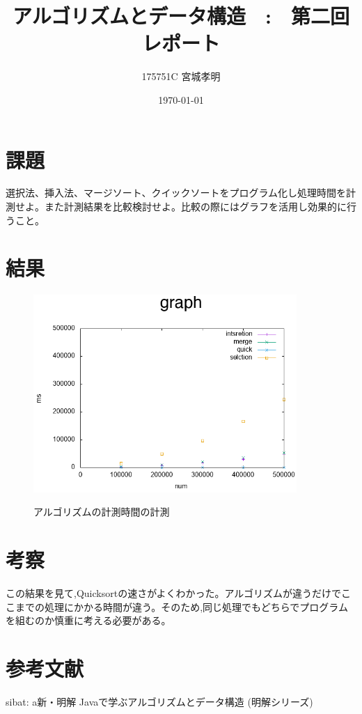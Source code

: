 \documentclass[a4paper,11pt,titlepage]{jarticle}
\title{アルゴリズムとデータ構造　:　第二回レポート}
\author{175751C 宮城孝明}
\date{\today}
\begin{document}
\maketitle
\tableofcontents
\clearpage

\section{課題}
選択法、挿入法、マージソート、クイックソートをプログラム化し処理時間を計測せよ。また計測結果を比較検討せよ。比較の際にはグラフを活用し効果的に行うこと。\par
\section{結果}
\begin{figure}[htbp]
  \centering
  \includegraphics[width=100mm]{task1.png}
  \label{graph}
  \caption{アルゴリズムの計測時間の計測}
\end{figure}

\section{考察}
この結果を見て,Quicksortの速さがよくわかった。アルゴリズムが違うだけでここまでの処理にかかる時間が違う。そのため,同じ処理でもどちらでプログラムを組むのか慎重に考える必要がある。\par
\section{参考文献}
\begin{thebibliography}{}
  sibat: a新・明解 Javaで学ぶアルゴリズムとデータ構造 (明解シリーズ) 
 \end{thebibliography}{}
\end{document}
